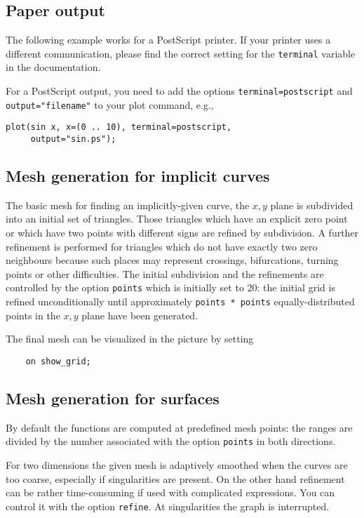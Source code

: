 \subsection{Paper output}

The following example works for a PostScript printer.  If your printer uses a
different communication, please find the correct setting for the \texttt{terminal}
variable in the {\Gnuplot} documentation.

For a PostScript output, you need to add the options \texttt{terminal=postscript} and \allowbreak
\texttt{output="filename"} to your plot command, e.g.,
\begin{verbatim}
plot(sin x, x=(0 .. 10), terminal=postscript,
     output="sin.ps");
\end{verbatim}


\subsection{Mesh generation for implicit curves}

The basic mesh for finding an implicitly-given curve, the $x,y$ plane is
subdivided into an initial set of triangles.  Those triangles which have an
explicit zero point or which have two points with different signs are refined by
subdivision.  A further refinement is performed for triangles which do not have
exactly two zero neighbours because such places may represent crossings,
bifurcations, turning points or other difficulties.  The initial subdivision and
the refinements are controlled by the option \texttt{points} which is initially
set to 20: the initial grid is refined unconditionally until
approximately \texttt{points * points} equally-distributed points in the $x,y$
plane have been generated.

The final mesh can be visualized in the picture by setting
\begin{verbatim}
    on show_grid;
\end{verbatim}


\subsection{Mesh generation for surfaces}

By default the functions are computed at predefined mesh points: the ranges are
divided by the number associated with the option \texttt{points} in both
directions.

For two dimensions the given mesh is adaptively smoothed when the curves are too
coarse, especially if singularities are present. On the other hand refinement
can be rather time-consuming if used with complicated expressions. You can
control it with the option \texttt{refine}.  At singularities the graph is
interrupted.

